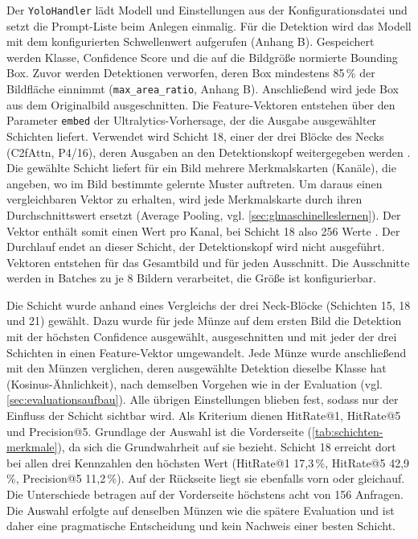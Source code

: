 \noindent Der \lstinline|YoloHandler| lädt Modell und Einstellungen aus der Konfigurationsdatei und setzt die Prompt-Liste beim Anlegen einmalig. Für die Detektion wird das Modell mit dem konfigurierten Schwellenwert aufgerufen (Anhang B). Gespeichert werden Klasse, Confidence Score und die auf die Bildgröße normierte Bounding Box. Zuvor werden Detektionen verworfen, deren Box mindestens 85\,\% der Bildfläche einnimmt (\texttt{max\_area\_ratio}, Anhang B). Anschließend wird jede Box aus dem Originalbild ausgeschnitten. Die Feature-Vektoren entstehen über den Parameter \lstinline|embed| der Ultralytics-Vorhersage, der die Ausgabe ausgewählter Schichten liefert. Verwendet wird Schicht 18, einer der drei Blöcke des Necks (C2fAttn, P4/16), deren Ausgaben an den Detektionskopf weitergegeben werden . Die gewählte Schicht liefert für ein Bild mehrere Merkmalskarten (Kanäle), die angeben, wo im Bild bestimmte gelernte Muster auftreten. Um daraus einen vergleichbaren Vektor zu erhalten, wird jede Merkmalskarte durch ihren Durchschnittswert ersetzt (Average Pooling, vgl. \cref{sec:glmaschinelleslernen}). Der Vektor enthält somit einen Wert pro Kanal, bei Schicht 18 also 256 Werte . Der Durchlauf endet an dieser Schicht, der Detektionskopf wird nicht ausgeführt. Vektoren entstehen für das Gesamtbild und für jeden Ausschnitt. Die Ausschnitte werden in Batches zu je 8 Bildern verarbeitet, die Größe ist konfigurierbar.

Die Schicht wurde anhand eines Vergleichs der drei Neck-Blöcke (Schichten 15, 18 und 21) gewählt. Dazu wurde für jede Münze auf dem ersten Bild die Detektion mit der höchsten Confidence ausgewählt, ausgeschnitten und mit jeder der drei Schichten in einen Feature-Vektor umgewandelt. Jede Münze wurde anschließend mit den Münzen verglichen, deren ausgewählte Detektion dieselbe Klasse hat (Kosinus-Ähnlichkeit), nach demselben Vorgehen wie in der Evaluation (vgl. \cref{sec:evaluationsaufbau}). Alle übrigen Einstellungen blieben fest, sodass nur der Einfluss der Schicht sichtbar wird. Als Kriterium dienen HitRate@1, HitRate@5 und Precision@5. Grundlage der Auswahl ist die Vorderseite (\cref{tab:schichten-merkmale}), da sich die Grundwahrheit auf sie bezieht. Schicht 18 erreicht dort bei allen drei Kennzahlen den höchsten Wert (HitRate@1 17,3\,\%, HitRate@5 42,9\,\%, Precision@5 11,2\,\%). Auf der Rückseite liegt sie ebenfalls vorn oder gleichauf. Die Unterschiede betragen auf der Vorderseite höchstens acht von 156 Anfragen. Die Auswahl erfolgte auf denselben Münzen wie die spätere Evaluation und ist daher eine pragmatische Entscheidung und kein Nachweis einer besten Schicht. 

